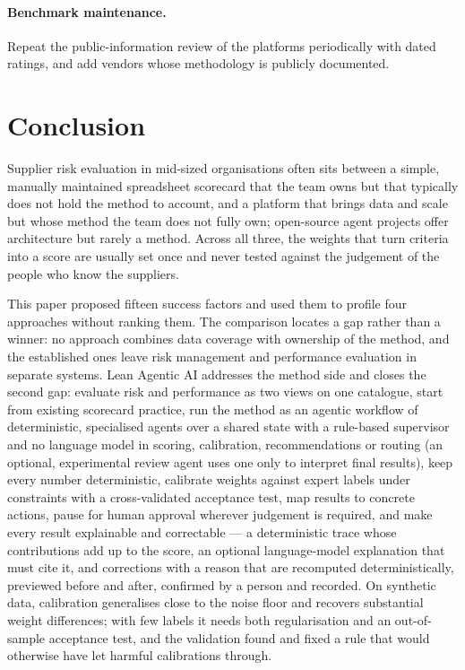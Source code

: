 \documentclass[10pt,twocolumn,a4paper]{article}
\begin{document}
\paragraph{Benchmark maintenance.} Repeat the public-information review of the platforms
periodically with dated ratings, and add vendors whose methodology is publicly
documented.

\section{Conclusion}
\label{sec:conclusion}

Supplier risk evaluation in mid-sized organisations often sits between a simple, manually
maintained spreadsheet scorecard that the team owns but that typically does not hold the
method to account, and a platform that brings data and scale but whose method
the team does not fully own; open-source agent projects offer architecture but rarely a
method. Across all three, the weights that turn criteria into a score are usually set
once and never tested against the judgement of the people who know the suppliers.

This paper proposed fifteen success factors and used them to profile four approaches
without ranking them. The comparison locates a gap rather than a winner: no approach
combines data coverage with ownership of the method, and the established ones leave risk
management and performance evaluation in separate systems. Lean Agentic AI addresses the
method side and closes the second gap: evaluate risk and performance as two views on one
catalogue, start from existing scorecard practice, run the method as an agentic workflow
of deterministic, specialised agents over a shared state with a rule-based supervisor and no
language model in scoring, calibration, recommendations or routing (an optional,
experimental review agent uses one only to interpret final results), keep every number
deterministic, calibrate
weights against expert labels under constraints with a cross-validated acceptance test,
map results to concrete actions, pause for human approval wherever judgement is
required, and make every result explainable and correctable --- a deterministic trace whose
contributions add up to the score, an optional language-model explanation that must cite it,
and corrections with a reason that are recomputed deterministically, previewed before and
after, confirmed by a person and recorded. On synthetic data, calibration generalises close to the noise
floor and recovers substantial weight differences; with few labels it needs both
regularisation and an out-of-sample acceptance test, and the validation found and fixed a
rule that would otherwise have let harmful calibrations through.
\end{document}
